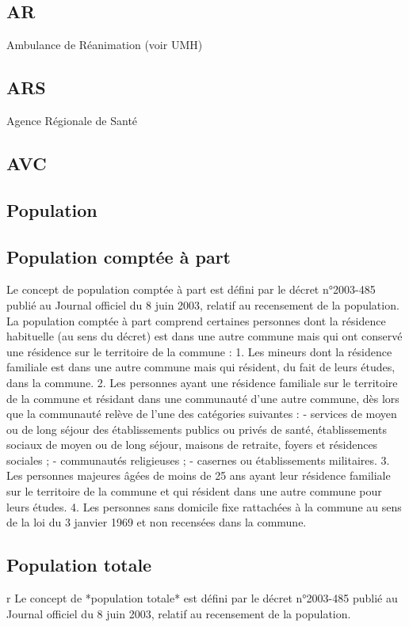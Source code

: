 \documentclass[12pt,english,french,twoside]{report}\usepackage[]{graphicx}\usepackage[]{color}
\begin{document}
\subsection*{AR}
Ambulance de Réanimation (voir UMH)

\subsection*{ARS}
Agence Régionale de Santé

\subsection*{AVC}

\subsection*{Population}

\subsection*{Population comptée à part}
Le concept de population comptée à part est défini par le décret n°2003-485 publié au Journal officiel du 8 juin 2003, relatif au recensement de la population.
La population comptée à part comprend certaines personnes dont la résidence habituelle (au sens du décret) est dans une autre commune mais qui ont conservé une résidence sur le territoire de la commune :
1. Les mineurs dont la résidence familiale est dans une autre commune mais qui résident, du fait de leurs études, dans la commune.
2. Les personnes ayant une résidence familiale sur le territoire de la commune et résidant dans une communauté d'une autre commune, dès lors que la communauté relève de l'une des catégories suivantes :
- services de moyen ou de long séjour des établissements publics ou privés de santé, établissements sociaux de moyen ou de long séjour, maisons de retraite, foyers et résidences sociales ;
- communautés religieuses ;
- casernes ou établissements militaires.
3. Les personnes majeures âgées de moins de 25 ans ayant leur résidence familiale sur le territoire de la commune et qui résident dans une autre commune pour leurs études.
4. Les personnes sans domicile fixe rattachées à la commune au sens de la loi du 3 janvier 1969 et non recensées dans la commune. \cite{8}


\subsection*{Population totale}
r
Le concept de *population totale* est défini par le décret n°2003-485 publié au Journal officiel du 8 juin 2003, relatif au recensement de la population.
\end{document}
